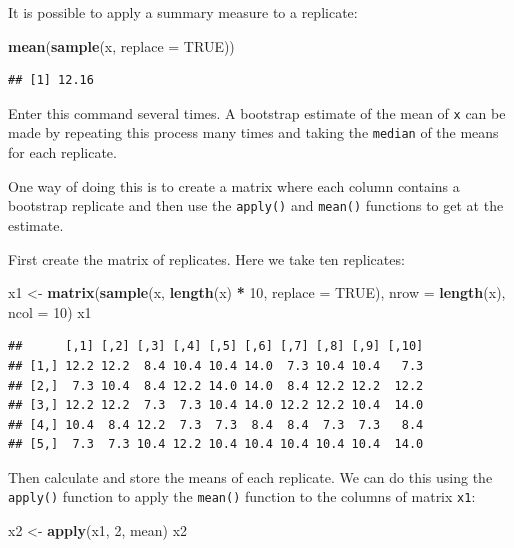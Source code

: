 \documentclass[12pt,a4paper]{book}
\newenvironment{Shaded}{\begin{snugshade}}{\end{snugshade}}
\newcommand{\KeywordTok}[1]{\textcolor[rgb]{0.13,0.29,0.53}{\textbf{#1}}}
\newcommand{\DataTypeTok}[1]{\textcolor[rgb]{0.13,0.29,0.53}{#1}}
\newcommand{\DecValTok}[1]{\textcolor[rgb]{0.00,0.00,0.81}{#1}}
\newcommand{\StringTok}[1]{\textcolor[rgb]{0.31,0.60,0.02}{#1}}
\newcommand{\OtherTok}[1]{\textcolor[rgb]{0.56,0.35,0.01}{#1}}
\newcommand{\OperatorTok}[1]{\textcolor[rgb]{0.81,0.36,0.00}{\textbf{#1}}}
\newcommand{\NormalTok}[1]{#1}
\theoremstyle{definition}
\theoremstyle{definition}
\theoremstyle{definition}
\theoremstyle{remark}
\begin{document}
It is possible to apply a summary measure to a replicate:

\begin{Shaded}
\begin{Highlighting}[]
\KeywordTok{mean}\NormalTok{(}\KeywordTok{sample}\NormalTok{(x, }\DataTypeTok{replace =} \OtherTok{TRUE}\NormalTok{))}
\end{Highlighting}
\end{Shaded}

\begin{verbatim}
## [1] 12.16
\end{verbatim}

Enter this command several times. A bootstrap estimate of the mean of
\texttt{x} can be made by repeating this process many times and taking
the \texttt{median} of the means for each replicate.

One way of doing this is to create a matrix where each column contains a
bootstrap replicate and then use the \texttt{apply()} and
\texttt{mean()} functions to get at the estimate.

First create the matrix of replicates. Here we take ten replicates:

\begin{Shaded}
\begin{Highlighting}[]
\NormalTok{x1 <-}\StringTok{ }\KeywordTok{matrix}\NormalTok{(}\KeywordTok{sample}\NormalTok{(x, }\KeywordTok{length}\NormalTok{(x) }\OperatorTok{*}\StringTok{ }\DecValTok{10}\NormalTok{, }\DataTypeTok{replace =} \OtherTok{TRUE}\NormalTok{),}
             \DataTypeTok{nrow =} \KeywordTok{length}\NormalTok{(x), }\DataTypeTok{ncol =} \DecValTok{10}\NormalTok{)}
\NormalTok{x1}
\end{Highlighting}
\end{Shaded}

\begin{verbatim}
##      [,1] [,2] [,3] [,4] [,5] [,6] [,7] [,8] [,9] [,10]
## [1,] 12.2 12.2  8.4 10.4 10.4 14.0  7.3 10.4 10.4   7.3
## [2,]  7.3 10.4  8.4 12.2 14.0 14.0  8.4 12.2 12.2  12.2
## [3,] 12.2 12.2  7.3  7.3 10.4 14.0 12.2 12.2 10.4  14.0
## [4,] 10.4  8.4 12.2  7.3  7.3  8.4  8.4  7.3  7.3   8.4
## [5,]  7.3  7.3 10.4 12.2 10.4 10.4 10.4 10.4 10.4  14.0
\end{verbatim}

Then calculate and store the means of each replicate. We can do this
using the \texttt{apply()} function to apply the \texttt{mean()}
function to the columns of matrix \texttt{x1}:

\begin{Shaded}
\begin{Highlighting}[]
\NormalTok{x2 <-}\StringTok{ }\KeywordTok{apply}\NormalTok{(x1, }\DecValTok{2}\NormalTok{, mean)}
\NormalTok{x2}
\end{Highlighting}
\end{Shaded}
\end{document}
